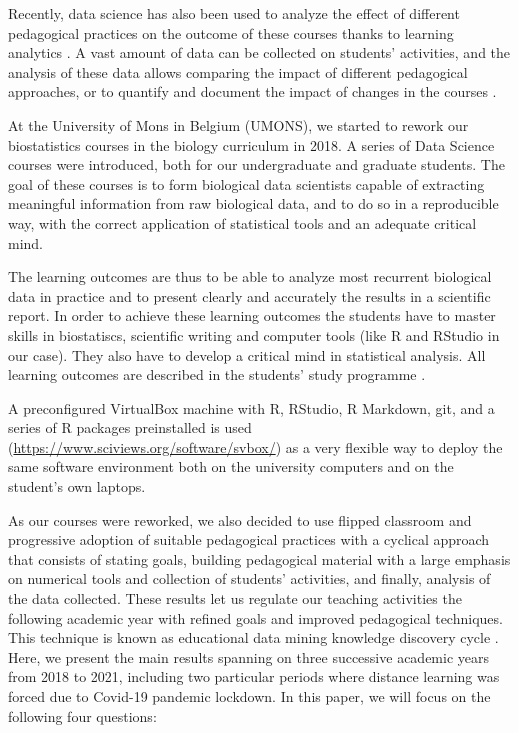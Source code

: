 \documentclass{aims}
\theoremstyle{definition}
\begin{document}
Recently, data science has also been used to analyze the effect of
different pedagogical practices on the outcome of these courses thanks
to learning analytics \cite{Estrellado2020}. A vast amount of data can
be collected on students' activities, and the analysis of these data
allows comparing the impact of different pedagogical approaches, or to
quantify and document the impact of changes in the courses
\cite{Romero2020}.

At the University of Mons in Belgium (UMONS), we started to rework our
biostatistics courses in the biology curriculum in 2018. A series of
Data Science courses were introduced, both for our undergraduate and
graduate students. The goal of these courses is to form biological data
scientists capable of extracting meaningful information from raw
biological data, and to do so in a reproducible way, with the correct
application of statistical tools and an adequate critical mind.

The learning outcomes are thus to be able to analyze most recurrent
biological data in practice and to present clearly and accurately the
results in a scientific report. In order to achieve these learning
outcomes the students have to master skills in biostatiscs, scientific
writing and computer tools (like R and RStudio in our case). They also
have to develop a critical mind in statistical analysis. All learning
outcomes are described in the students' study programme
\cite{ds1bio2021, ds2bio2021, ds3bio2021}.

A preconfigured VirtualBox machine with R, RStudio, R Markdown, git, and
a series of R packages preinstalled is used
(\url{https://www.sciviews.org/software/svbox/}) as a very flexible way
to deploy the same software environment both on the university computers
and on the student's own laptops.

As our courses were reworked, we also decided to use flipped classroom
and progressive adoption of suitable pedagogical practices with a
cyclical approach that consists of stating goals, building pedagogical
material with a large emphasis on numerical tools and collection of
students' activities, and finally, analysis of the data collected. These
results let us regulate our teaching activities the following academic
year with refined goals and improved pedagogical techniques. This
technique is known as educational data mining knowledge discovery cycle
\cite{Romero2020}. Here, we present the main results spanning on three
successive academic years from 2018 to 2021, including two particular
periods where distance learning was forced due to Covid-19 pandemic
lockdown. In this paper, we will focus on the following four questions:
\end{document}
